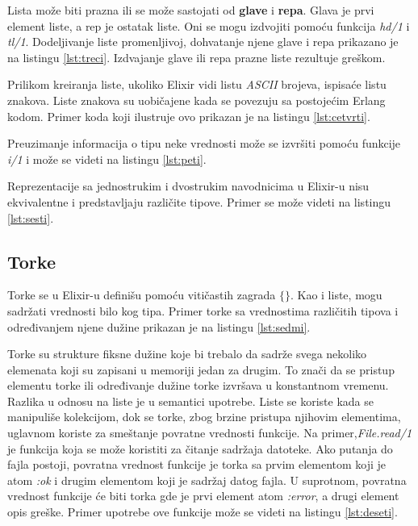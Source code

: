 \documentclass[12pt,oneside]{memoir}
\begin{document}
Lista može biti prazna ili se može sastojati od \textbf{glave} i \textbf{repa}. Glava je prvi element liste, a rep je ostatak liste. Oni se mogu izdvojiti pomoću funkcija \textit{hd/1} i \textit{tl/1}. Dodeljivanje liste promenljivoj, dohvatanje njene glave i repa prikazano je na listingu \ref{lst:treci}. Izdvajanje glave ili repa prazne liste rezultuje greškom.



Prilikom kreiranja liste, ukoliko Elixir vidi listu \textit{ASCII} brojeva, ispisaće listu znakova. Liste znakova su uobičajene kada se povezuju sa postojećim Erlang kodom. Primer koda koji ilustruje ovo prikazan je na listingu \ref{lst:cetvrti}.



 

Preuzimanje informacija o tipu neke vrednosti može se izvršiti pomoću funkcije \textit{i/1} i može se videti na listingu \ref{lst:peti}.



Reprezentacije sa jednostrukim i dvostrukim navodnicima u Elixir-u nisu ekvivalentne i predstavljaju različite tipove. Primer se može videti na listingu \ref{lst:sesti}.



\subsection{Torke}

Torke se u Elixir-u definišu pomoću vitičastih zagrada $\{\}$. Kao i liste, mogu sadržati vrednosti bilo kog tipa. Primer torke sa vrednostima različitih tipova i određivanjem njene dužine prikazan je na listingu \ref{lst:sedmi}.



Torke su strukture fiksne dužine koje bi trebalo da sadrže svega nekoliko elemenata koji su zapisani u memoriji jedan za drugim. To znači da se pristup elementu torke ili određivanje dužine torke izvršava u konstantnom vremenu. Razlika u odnosu na liste je u semantici upotrebe. Liste se koriste kada se manipuliše kolekcijom, dok se torke, zbog brzine pristupa njihovim elementima, uglavnom koriste za smeštanje povratne vrednosti funkcije. Na primer,\textit{File.read/1} je funkcija koja se može koristiti za čitanje sadržaja datoteke. Ako putanja do fajla postoji, povratna vrednost funkcije je torka sa prvim elementom koji je atom \textit{:ok} i drugim elementom koji je sadržaj datog fajla. U suprotnom, povratna vrednost funkcije će biti torka gde je prvi element atom \textit{:error}, a drugi element opis greške. Primer upotrebe ove funkcije može se videti na listingu \ref{lst:deseti}.
\end{document}
